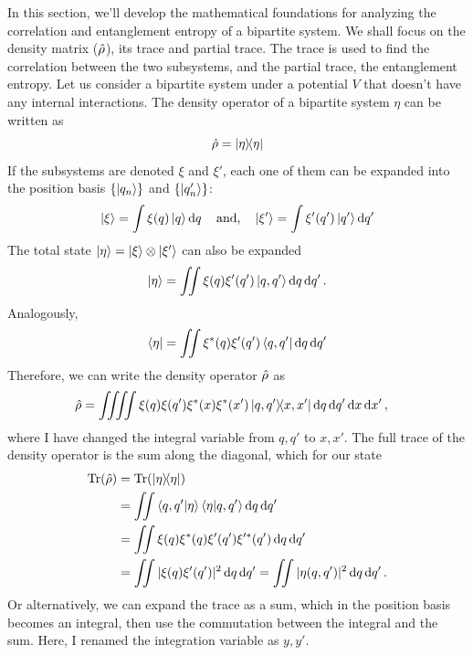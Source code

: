 In this section, we'll develop the mathematical foundations for analyzing the correlation and entanglement entropy of a bipartite system. We shall focus on the density matrix ($\hat{\rho}$), its trace and partial trace. The trace is used to find the correlation between the two subsystems, and the partial trace, the entanglement entropy. Let us consider a bipartite system under a potential $V$ that doesn't have any internal interactions. The density operator of a bipartite system $\eta$ can be written as
\begin{equation}
    \hat{\rho} = \ketbra{\eta}
\end{equation}
If the subsystems are denoted $\xi$ and $\xi'$, each one of them can be expanded into the position basis $\{\ket{q_n}\}$ and $\{\ket{q_n'}\}$:
\begin{gather}
    \ket{\xi} = \int\xi(q)\ket{q}\dd{q} \quad\textrm{and,}\quad \ket{\xi'} = \int\xi'(q')\ket{q'}\dd{q'}
\end{gather}
The total state $\ket{\eta} = \ket{\xi}\otimes\ket{\xi'}$ can also be expanded
\begin{equation}
    \ket{\eta} = \iint\xi(q)\xi'(q')\ket{q, q'}\dd{q}\dd{q'}.
\end{equation}
Analogously,
\begin{equation}
    \bra{\eta} = \iint\xi^{\ast}(q)\xi'(q')\bra{q, q'}\dd{q}\dd{q'}
\end{equation}
Therefore, we can write the density operator $\hat{\rho}$ as
\begin{align}
    \hat{\rho} &= \iiiint\xi(q)\xi(q')\xi^{\ast}(x)\xi^{\ast}(x')\ketbra{q, q'}{x, x'}\dd{q}\dd{q'}\dd{x}\dd{x'},
\end{align}
where I have changed the integral variable from $q, q'$ to $x, x'$. The full trace of the density operator is the sum along the diagonal, which for our state 
\begin{align}
    \Tr(\hat{\rho}) &= \Tr(\ketbra{\eta}) \\
    &= \iint\braket{q, q'}{\eta}\braket{\eta}{q, q'}\dd{q}\dd{q'} \\
    &= \iint\xi(q)\xi^{\ast}(q)\xi'(q')\xi^{\prime\ast}(q')\dd{q}\dd{q'} \\
    &= \iint|\xi(q)\xi'(q')|^2\dd{q}\dd{q'} = \iint|\eta(q, q')|^2\dd{q}\dd{q'}.
\end{align}
Or alternatively, we can expand the trace as a sum, which in the position basis becomes an integral, then use the commutation between the integral and the sum. Here, I renamed the integration variable as $y, y'$.
